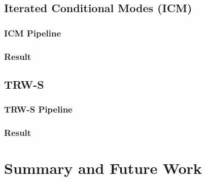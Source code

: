 \documentclass{article} %
\begin{document}
\subsection{Iterated Conditional Modes (ICM)}
\subsubsection{ICM Pipeline}

\subsubsection{Result}

\subsection{TRW-S}
\subsubsection{TRW-S Pipeline}
\subsubsection{Result}

\section{Summary and Future Work}


\end{document}
